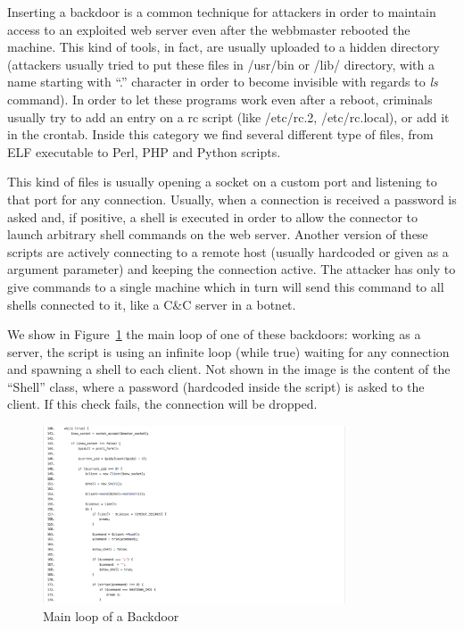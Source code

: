 Inserting a backdoor is a common technique for attackers in order to maintain access to an exploited web server even after the webbmaster rebooted the machine. This kind of tools, in fact, are usually uploaded to a hidden directory (attackers usually tried to put these files in /usr/bin or /lib/ directory, with a name starting with ``.'' character in order to become invisible with regards to \emph{ls} command). In order to let these programs work even after a reboot, criminals usually try to add an entry on a rc script (like /etc/rc.2, /etc/rc.local), or add it in the crontab. Inside this category we find several different type of files, from ELF executable to Perl, PHP and Python scripts.

This kind of files is usually opening a socket on a custom port and listening to that port for any connection. Usually, when a connection is received a password is asked and, if positive, a shell is executed in order to allow the connector to launch arbitrary shell commands on the web server. Another version of these scripts are actively connecting to a remote host (usually hardcoded or given as a argument parameter) and keeping the connection active. The attacker has only to give commands to a single machine which in turn will send this command to all shells connected to it, like a C\&C server in a botnet.

We show in Figure~\ref{fig:backDoor} the main loop of one of these backdoors: working as a server, the script is using an infinite loop (while true) waiting for any connection and spawning a shell to each client. Not shown in the image is the content of the ``Shell'' class, where a password (hardcoded inside the script) is asked to the client. If this check fails, the connection will be dropped.

\begin{figure}[H]
\centerline{\includegraphics[width=0.8\textwidth]{Images/backDoor.jpg}}
\caption{Main loop of a Backdoor\label{fig:backDoor}}
\end{figure}


